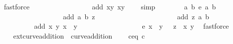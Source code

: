 \begin{isabellebody}
\ fastforce\ \ \ \ \ \ \ \ \isanewline
\ \ \ \ \ \ \isamarkupfalse%
\ \isamarkupfalse%
\ {\isachardoublequoteopen}add\ {\isacharparenleft}x{\isacharcomma}{\isacharminus}y{\isacharparenright}\ {\isacharparenleft}x{\isacharcomma}y{\isacharparenright}\ {\isacharequal}\ {\isacharparenleft}{}{\isacharcomma}{}{\isacharparenright}{\isachardoublequoteclose}\ \isamarkupfalse%
\ simp\isanewline
\ \ \ \ \ \ \isamarkupfalse%
\ {\isachardoublequoteopen}{\isasymexists}a\ b{\isachardot}\ e\ a\ b\ {\isacharequal}\ {}\ {\isasymand}\isanewline
\ \ \ \ \ \ \ \ \ \ \ \ \ \ \ \ \ \ add\ {\isacharparenleft}a{\isacharcomma}\ b{\isacharparenright}\ z\ {\isacharequal}\ {\isacharparenleft}{}{\isacharcomma}\ {}{\isacharparenright}\ {\isasymand}\ \isanewline
\ \ \ \ \ \ \ \ \ \ \ \ \ \ \ \ \ \ add\ z\ {\isacharparenleft}a{\isacharcomma}\ b{\isacharparenright}\ {\isacharequal}\ {\isacharparenleft}{}{\isacharcomma}\ {}{\isacharparenright}{\isachardoublequoteclose}\ \isanewline
\ \ \ \ \ \ \ \ \isamarkupfalse%
\ {\isacartoucheopen}add\ {\isacharparenleft}x{\isacharcomma}\ y{\isacharparenright}\ {\isacharparenleft}x{\isacharcomma}\ {\isacharminus}\ y{\isacharparenright}\ {\isacharequal}\ {\isacharparenleft}{}{\isacharcomma}\ {}{\isacharparenright}{\isacartoucheclose}\ \isanewline
\ \ \ \ \ \ \ \ \ \ \ \ \ \ {\isacartoucheopen}e\ x\ {\isacharparenleft}{\isacharminus}\ y{\isacharparenright}\ {\isacharequal}\ {}{\isacartoucheclose}\ {\isacartoucheopen}z\ {\isacharequal}\ {\isacharparenleft}x{\isacharcomma}\ y{\isacharparenright}{\isacartoucheclose}\ \isamarkupfalse%
\ fastforce\isanewline
\ \ \ \ \isamarkupfalse%
\isanewline
\ \ \isamarkupfalse%
\isanewline
{}\isamarkupfalse%
%
\endisatagproof
{\isafoldproof}%
%
\isadelimproof
\isanewline
%
\endisadelimproof
{}\isamarkupfalse%
%
\isadelimdocument
%
\endisadelimdocument
%
\isatagdocument
%
\isamarkuptrue%
%
\endisatagdocument
{\isafolddocument}%
%
\isadelimdocument
%
\endisadelimdocument
{}\isamarkupfalse%
\ ext{\isacharunderscore}curve{\isacharunderscore}addition\ {\isacharequal}\ curve{\isacharunderscore}addition\ {\isacharplus}\isanewline
\ \ \ c{\isacharunderscore}eq{\isacharunderscore}{}{\isacharcolon}\ {\isachardoublequoteopen}c\ {\isacharequal}\ {}{\isachardoublequoteclose}\ \isanewline

\end{isabellebody}
